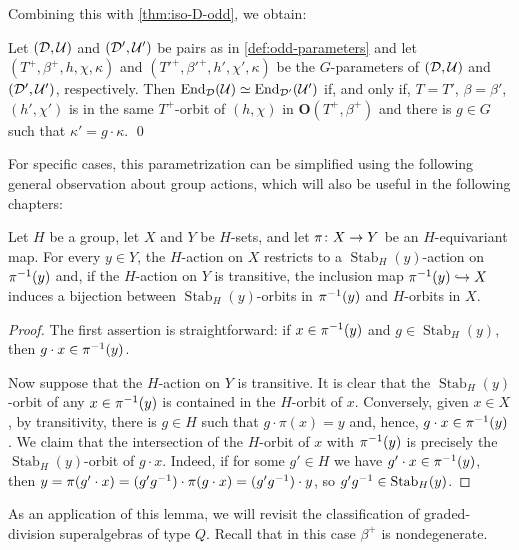 Combining this with \cref{thm:iso-D-odd}, we obtain: 

\begin{cor}\label{cor:classification-odd-general}
    Let $(\mathcal{D}, \mathcal U)$ and $(\mathcal{D}', \mathcal U')$ be pairs as in  \cref{def:odd-parameters} and let $(T^+, \beta^+, h, \chi, \kappa)$ and $(T'^+, \beta'^+, h', \chi', \kappa)$ be the $G$-parameters of $(\mathcal{D}, \mathcal U)$ and $(\mathcal{D}', \mathcal U')$, respectively. 
	Then $\operatorname{End}_{\mathcal{D}} (\mathcal U) \simeq \operatorname{End}_{\mathcal{D}'} (\mathcal U')$ if, and only if, $T=T'$, $\beta=\beta'$, $(h', \chi')$ is in the same $T^+$-orbit of $(h, \chi)$ in $\mathbf {O} (T^+, \beta^+)$ and there is $g\in G$ such that $\kappa' = g \cdot \kappa$. \qed
\end{cor}

For specific cases, this parametrization can be simplified using the following general observation about group actions, which will also be useful in the following chapters: 

\begin{lemma}\label{lemma:lemma-on-actions}
    Let $H$ be a group, let $X$ and $Y$ be $H$-sets, and let $\pi\colon X \to Y$ be an $H$-equivariant map. 
    For every $y \in Y$, the $H$-action on $X$ restricts to a $\operatorname{Stab}_H (y)$-action on $\pi^{-1}(y)$ and, if the $H$-action on $Y$ is transitive, the inclusion map $\pi^{-1}(y) \hookrightarrow X$ induces a bijection between $\operatorname{Stab}_H (y)$-orbits in $\pi^{-1}(y)$ and $H$-orbits in $X$.  
\end{lemma}

\begin{proof}
    The first assertion is straightforward: if $x\in \pi^{-1}(y)$ and $g \in \operatorname{Stab}_H (y)$, then $g \cdot x \in \pi^{-1}(y)$. 
    
    Now suppose that the $H$-action on $Y$ is transitive. 
    It is clear that the $\operatorname{Stab}_H (y)$-orbit of any $x\in \pi^{-1} (y)$ is contained in the $H$-orbit of $x$. 
    Conversely, given $x\in X$, by transitivity, there is $g\in H$ such that $g \cdot \pi(x) = y$ and, hence, $g\cdot x \in \pi^{-1} (y)$. 
    We claim that the intersection of the $H$-orbit of $x$ with $\pi^{-1} (y)$ is precisely the  $\operatorname{Stab}_H (y)$-orbit of $g\cdot x$. 
    Indeed, if for some $g'\in H$ we have $g'\cdot x \in \pi^{-1}(y)$, then $y = \pi(g'\cdot x) = (g'g^{-1})\cdot \pi(g\cdot x) = (g'g^{-1}) \cdot y$, so $g'g^{-1} \in \operatorname{Stab}_H (y)$.
\end{proof}

As an application of this lemma, we will revisit the classification of graded-division superalgebras of type $Q$. 
Recall that in this case $\beta^+$ is nondegenerate. 

